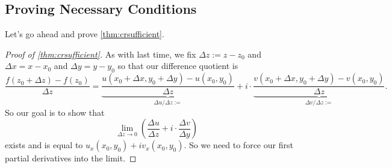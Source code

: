 \subsection{Proving Necessary Conditions}
Let's go ahead and prove \autoref{thm:crsufficient}.
\begin{proof}[Proof of \autoref{thm:crsufficient}]
	As with last time, we fix $\Delta z:=z-z_0$ and $\Delta x=x-x_0$ and $\Delta y=y-y_0$ so that our difference quotient is
	\[\frac{f(z_0+\Delta z)-f(z_0)}{\Delta z}=\underbrace{\frac{u(x_0+\Delta x,y_0+\Delta y)-u(x_0,y_0)}{\Delta z}}_{\Delta u/\Delta z:=}+i\cdot\underbrace{\frac{v(x_0+\Delta x,y_0+\Delta y)-v(x_0,y_0)}{\Delta z}}_{\Delta v/\Delta z:=}.\]
	So our goal is to show that
	\[\lim_{\Delta z\to0}\left(\frac{\Delta u}{\Delta z}+i\cdot\frac{\Delta v}{\Delta y}\right)\]
	exists and is equal to $u_x(x_0,y_0)+iv_x(x_0,y_0)$. So we need to force our first partial derivatives into the limit.


\end{proof}
